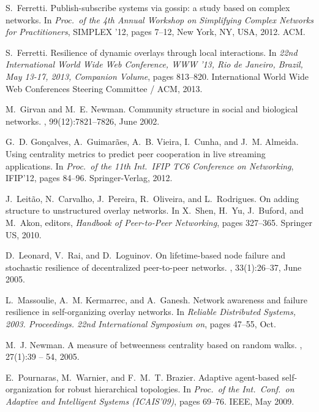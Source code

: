 \documentclass[10pt, conference, compsocconf]{IEEEtran}
\begin{document}
\begin{thebibliography}{10}
S.~Ferretti.
\newblock Publish-subscribe systems via gossip: a study based on complex
  networks.
\newblock In {\em Proc.~of the 4th Annual Workshop on Simplifying Complex
  Networks for Practitioners}, SIMPLEX '12, pages 7--12, New York, NY, USA,
  2012. ACM.

S.~Ferretti.
\newblock Resilience of dynamic overlays through local interactions.
\newblock In {\em 22nd International World Wide Web Conference, WWW '13, Rio de
  Janeiro, Brazil, May 13-17, 2013, Companion Volume}, pages 813--820.
  International World Wide Web Conferences Steering Committee / ACM, 2013.

M.~Girvan and M.~E. Newman.
\newblock Community structure in social and biological networks.
, 99(12):7821--7826, June 2002.

G.~D. Gon\c{c}alves, A.~Guimar\~{a}es, A.~B. Vieira, I.~Cunha, and J.~M.
  Almeida.
\newblock Using centrality metrics to predict peer cooperation in live
  streaming applications.
\newblock In {\em Proc.~of the 11th Int.~IFIP TC6 Conference on Networking},
  IFIP'12, pages 84--96. Springer-Verlag, 2012.

J.~Leitão, N.~Carvalho, J.~Pereira, R.~Oliveira, and L.~Rodrigues.
\newblock On adding structure to unstructured overlay networks.
\newblock In X.~Shen, H.~Yu, J.~Buford, and M.~Akon, editors, {\em Handbook of
  Peer-to-Peer Networking}, pages 327--365. Springer US, 2010.

D.~Leonard, V.~Rai, and D.~Loguinov.
\newblock On lifetime-based node failure and stochastic resilience of
  decentralized peer-to-peer networks.
, 33(1):26--37, June 2005.

L.~Massoulie, A.~M. Kermarrec, and A.~Ganesh.
\newblock Network awareness and failure resilience in self-organizing overlay
  networks.
\newblock In {\em Reliable Distributed Systems, 2003. Proceedings. 22nd
  International Symposium on}, pages 47--55, Oct.

M.~J. Newman.
\newblock A measure of betweenness centrality based on random walks.
, 27(1):39 -- 54, 2005.

E.~Pournaras, M.~Warnier, and F.~M.~T. Brazier.
\newblock Adaptive agent-based self-organization for robust hierarchical
  topologies.
\newblock In {\em Proc.~of the Int.~Conf.~on Adaptive and Intelligent Systems
  (ICAIS'09)}, pages 69--76. IEEE, May 2009.


\end{thebibliography}
\end{document}
